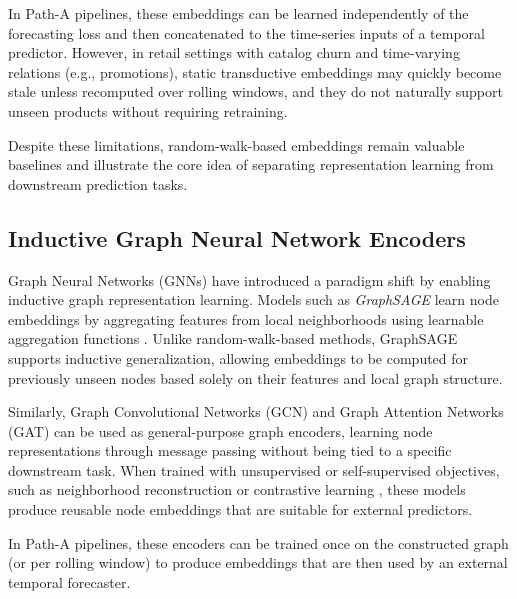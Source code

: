In Path-A pipelines, these embeddings can be learned independently of the forecasting loss and then concatenated to the time-series inputs of a temporal predictor. However, in retail settings with catalog churn and time-varying relations (e.g., promotions), static transductive embeddings may quickly become stale unless recomputed over rolling windows, and they do not naturally support unseen products without requiring retraining.

Despite these limitations, random-walk-based embeddings remain valuable baselines and illustrate the core idea of separating representation learning from downstream prediction tasks.


\subsection{Inductive Graph Neural Network Encoders}

Graph Neural Networks (GNNs) have introduced a paradigm shift by enabling inductive graph representation learning. Models such as \emph{GraphSAGE} learn node embeddings by aggregating features from local neighborhoods using learnable aggregation functions \cite{hamilton2017graphsage}. Unlike random-walk-based methods, GraphSAGE supports inductive generalization, allowing embeddings to be computed for previously unseen nodes based solely on their features and local graph structure.

Similarly, Graph Convolutional Networks (GCN) \cite{kipf2017semi} and Graph Attention Networks (GAT) \cite{velickovic2018graph} can be used as general-purpose graph encoders, learning node representations through message passing without being tied to a specific downstream task. When trained with unsupervised or self-supervised objectives, such as neighborhood reconstruction or contrastive learning \cite{velickovic2019deep, zhu2020deep}, these models produce reusable node embeddings that are suitable for external predictors.

In Path-A pipelines, these encoders can be trained once on the constructed graph (or per rolling window) to produce embeddings that are then used by an external temporal forecaster.

